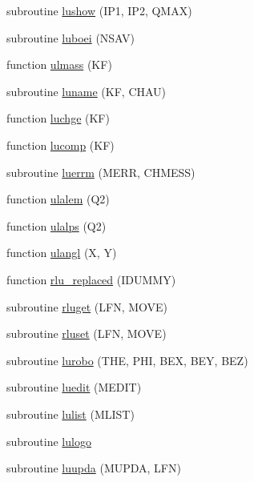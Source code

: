 \begin{DoxyCompactItemize}
\item 
subroutine \hyperlink{jetset7409_8f_a0bdbe298274d1bf15e7098046b96239e}{lushow} (I\+P1, I\+P2, Q\+M\+A\+X)
\item 
subroutine \hyperlink{jetset7409_8f_a762ad9eeab644f704f5de8395bd89997}{luboei} (N\+S\+A\+V)
\item 
function \hyperlink{jetset7409_8f_aa951cb677600842104db95323a7647b2}{ulmass} (K\+F)
\item 
subroutine \hyperlink{jetset7409_8f_a87cfaa02a00bc60d5b1ce6c2fce29432}{luname} (K\+F, C\+H\+A\+U)
\item 
function \hyperlink{jetset7409_8f_a86938fb3242850e133e3b60d256582b7}{luchge} (K\+F)
\item 
function \hyperlink{jetset7409_8f_af4e2c29d51aeb470efbf59be26e18d04}{lucomp} (K\+F)
\item 
subroutine \hyperlink{jetset7409_8f_ab2b89149ed6c532c613c12ae6c351b5d}{luerrm} (M\+E\+R\+R, C\+H\+M\+E\+S\+S)
\item 
function \hyperlink{jetset7409_8f_a59f4ea713816e8bcd665aef916e6bad7}{ulalem} (Q2)
\item 
function \hyperlink{jetset7409_8f_ab97912b68e33a5152f0271fc0dbc311d}{ulalps} (Q2)
\item 
function \hyperlink{jetset7409_8f_a13a8d5a72aa20b0ae2ceca14e31467ba}{ulangl} (X, Y)
\item 
function \hyperlink{jetset7409_8f_a4758ce80e3e68c1512788bab3abe9a0c}{rlu\+\_\+replaced} (I\+D\+U\+M\+M\+Y)
\item 
subroutine \hyperlink{jetset7409_8f_aea3b04f21086e3eea89983ad08de76ac}{rluget} (L\+F\+N, M\+O\+V\+E)
\item 
subroutine \hyperlink{jetset7409_8f_aae19dd29cb0444e2034b7e94409bb8ed}{rluset} (L\+F\+N, M\+O\+V\+E)
\item 
subroutine \hyperlink{jetset7409_8f_acd0c9860f321d2221dd01a05b17a6bac}{lurobo} (T\+H\+E, P\+H\+I, B\+E\+X, B\+E\+Y, B\+E\+Z)
\item 
subroutine \hyperlink{jetset7409_8f_aaacc14ce32bf7ae36ea919afd5d45016}{luedit} (M\+E\+D\+I\+T)
\item 
subroutine \hyperlink{jetset7409_8f_a69a9c5efe2681d7e19be2b4ed218153e}{lulist} (M\+L\+I\+S\+T)
\item 
subroutine \hyperlink{jetset7409_8f_a9ede0e99adc856022ecf52cc85bde51c}{lulogo}
\item 
subroutine \hyperlink{jetset7409_8f_aff638e1a64b19f0b205bf2672a4d154e}{luupda} (M\+U\+P\+D\+A, L\+F\+N)
\item 

\end{DoxyCompactItemize}
